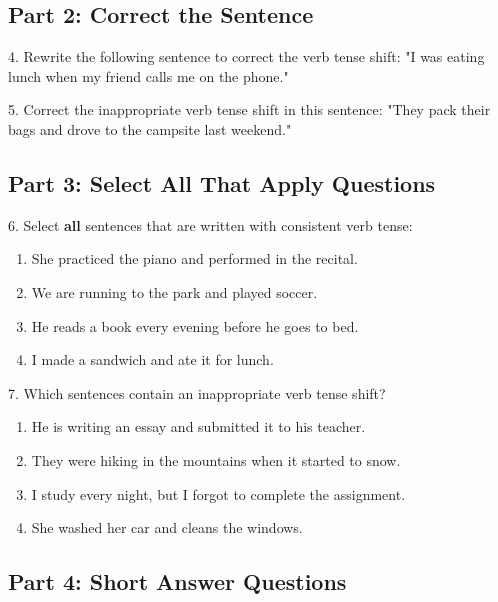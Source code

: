 \documentclass[12pt]{article}
\begin{document}
\vspace{1cm}

\subsection*{Part 2: Correct the Sentence}

4. Rewrite the following sentence to correct the verb tense shift:  
"I was eating lunch when my friend calls me on the phone."  
\vspace{3cm}

5. Correct the inappropriate verb tense shift in this sentence:  
"They pack their bags and drove to the campsite last weekend."  
\vspace{3cm}

\subsection*{Part 3: Select All That Apply Questions}

6. Select \textbf{all} sentences that are written with consistent verb tense:  
\begin{enumerate}[label=\Alph*.]
    \item She practiced the piano and performed in the recital.  
    \item We are running to the park and played soccer.  
    \item He reads a book every evening before he goes to bed.  
    \item I made a sandwich and ate it for lunch.  
\end{enumerate}

\vspace{1cm}

7. Which sentences contain an inappropriate verb tense shift?  
\begin{enumerate}[label=\Alph*.]
    \item He is writing an essay and submitted it to his teacher.  
    \item They were hiking in the mountains when it started to snow.  
    \item I study every night, but I forgot to complete the assignment.  
    \item She washed her car and cleans the windows.  
\end{enumerate}

\vspace{1cm}

\subsection*{Part 4: Short Answer Questions}
\end{document}
